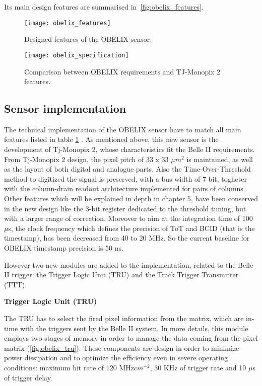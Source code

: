 Its main design features are summarised in~\autoref{fig:obelix_features}.


\begin{figure}[h!]
\centering
\texttt{[image: obelix\_features]}
\caption{Designed features of the OBELIX sensor.}
\label{fig:obelix_features}
\end{figure}

\begin{figure}[h!]
\centering
\texttt{[image: obelix\_specification]}
\caption{Comparison between OBELIX requirements and TJ-Monopix 2 features.}
\label{fig:obelix_specification}
\end{figure}

\subsection{Sensor implementation}

The technical implementation of the OBELIX sensor have to match all main features listed in table \ref{fig:obelix_features} .
As mentioned above, this new sensor is the development of Tj-Monopix 2, whose characteristics fit the Belle II requirements.\\

From Tj-Monopix 2 design, the pixel pitch of 33 x 33 $\mu m^{2}$ is maintained, as well as the layout of both digital and analogue parts. Also the Time-Over-Threshold method to digitized the signal is preserved, with a bus width of 7 bit, togheter with the column-drain readout architecture implemented for pairs of columns. Other features which will be explained in depth in chapter 5, have been conserved in the new design like the 3-bit register dedicated to the threshold tuning, but with a larger range of correction. 
Moreover to aim at the integration time of 100 $\mu$s, the clock frequency which defines the precision of ToT and BCID (that is the timestamp), has been decreased from 40 to 20 MHz. So the current baseline for OBELIX timestamp precision is 50 ns.

However two new modules are added to the implementation, related to the Belle II trigger: the Trigger Logic Unit (TRU) and the Track Trigger Transmitter (TTT). %

\begin{description}
\item \textbf{Trigger Logic Unit (TRU)}
\end{description}

The TRU has to select the fired pixel information from the matrix, which are in-time with the triggers sent by the Belle II system. In more details, this module employs two stages of memory in order to manage the data coming from the pixel matrix (\autoref{fig:obelix_tru}). These components are design in order to minimize power dissipation and to optimize the efficiency even in severe operating conditions: maximum hit rate of 120 MHz$cm^{-2}$, 30 KHz of trigger rate and 10 $\mu$s of trigger delay.

